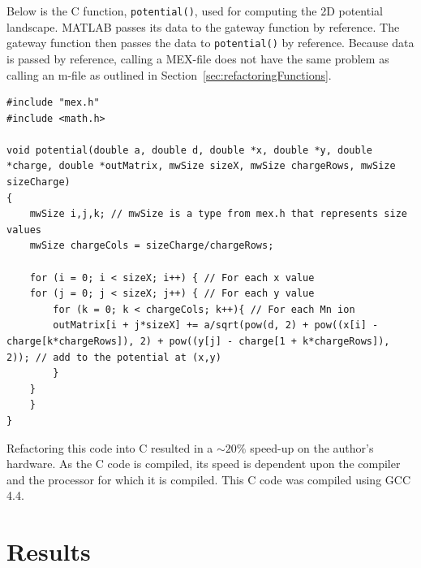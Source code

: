 \message{ !name(report.tex)}\documentclass[]{article}
\begin{document}
Below is the C function, \texttt{potential()}, used for computing the 2D potential landscape. MATLAB passes its data to the gateway function by reference. The gateway function then passes the data to \texttt{potential()} by reference. Because data is passed by reference, calling a MEX-file does not have the same problem as calling an m-file as outlined in Section~\ref{sec:refactoringFunctions}.

\lstset{language=C}  
\begin{lstlisting}
#include "mex.h"
#include <math.h>

void potential(double a, double d, double *x, double *y, double *charge, double *outMatrix, mwSize sizeX, mwSize chargeRows, mwSize sizeCharge)
{
    mwSize i,j,k; // mwSize is a type from mex.h that represents size values
    mwSize chargeCols = sizeCharge/chargeRows;

    for (i = 0; i < sizeX; i++) { // For each x value
	for (j = 0; j < sizeX; j++) { // For each y value
	    for (k = 0; k < chargeCols; k++){ // For each Mn ion
		outMatrix[i + j*sizeX] += a/sqrt(pow(d, 2) + pow((x[i] - charge[k*chargeRows]), 2) + pow((y[j] - charge[1 + k*chargeRows]), 2)); // add to the potential at (x,y)
	    }
	}
    }
}
\end{lstlisting}
Refactoring this code into C resulted in a $\sim 20\%$ speed-up on the author's hardware. As the C code is compiled, its speed is dependent upon the compiler and the processor for which it is compiled. This C code was compiled using GCC 4.4.

\section{Results}
\end{document}
